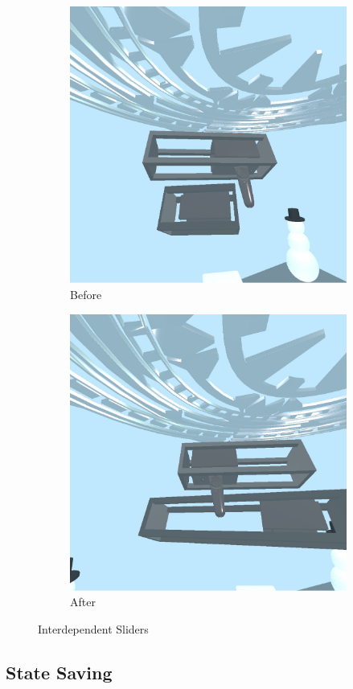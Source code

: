 \documentclass[conference,12pt]{IEEEtran}
\begin{document}
\begin{figure}[H]
    \begin{subfigure}{\linewidth}
        \centering
        \includegraphics[width=0.75\linewidth]{screenshots/slider_a.jpg}
        \caption{Before}
    \end{subfigure}
    \begin{subfigure}{\linewidth}
        \centering
        \includegraphics[width=0.75\linewidth]{screenshots/slider_b.jpg}
        \caption{After}
    \end{subfigure}
    \caption{Interdependent Sliders}
    \label{fig:sliders}
\end{figure}

\subsection{State Saving}
\end{document}
